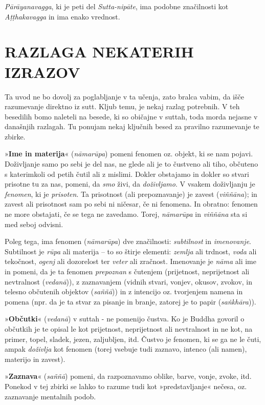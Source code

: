 \emph{Pārāyanavagga}, ki je peti del \emph{Sutta-nipāte}, ima podobne
značilnosti kot \emph{Aṭṭhakavagga} in ima enako vrednost.

\section{RAZLAGA NEKATERIH IZRAZOV}

Ta uvod ne bo dovolj za poglabljanje v ta učenja, zato bralca vabim, da
išče razumevanje direktno iz sutt. Kljub temu, je nekaj razlag
potrebnih. V teh besedilih bomo naleteli na besede, ki so običajne v
suttah, toda morda nejasne v današnjih razlagah. Tu ponujam nekaj
ključnih besed za pravilno razumevanje te zbirke.

»\textbf{Ime in materija}« (\emph{nāmarūpa}) pomeni fenomen oz. objekt,
ki se nam pojavi. Doživljanje samo po sebi je del nas, ne glede ali je
to čustveno ali tiho, občuteno s katerimkoli od petih čutil ali z
mislimi. Dokler obstajamo in dokler so stvari prisotne tu za nas,
pomeni, da \emph{smo} živi, da \emph{doživljamo}. V vsakem doživljanju
je \emph{fenomen}, ki je \emph{prisoten}. Ta prisotnost (ali
prepoznavanje) je zavest (\emph{viññāna}); in zavest ali prisotnost sam
po sebi ni ničesar, če ni fenomena. In obratno: fenomen ne more
obstajati, če se tega ne zavedamo. Torej, \emph{nāmarūpa} in
\emph{viññāna} sta si med seboj odvisni.

Poleg tega, ima fenomen (\emph{nāmarūpa}) dve značilnosti:
\emph{subtilnost} in \emph{imenovanje}. Subtilnost je \emph{rūpa} ali
materija -- to so štirje elementi: \emph{zemlja} ali trdnost,
\emph{voda} ali tekočnost, \emph{ogenj} ali dozorelost ter \emph{veter}
ali zračnost. Imenovanje je \emph{nāma} ali ime in pomeni, da je ta
fenomen \emph{prepoznan} s čutenjem (prijetnost, neprijetnost ali
nevtralnost (\emph{vedanā})), z zaznavanjem (vidnih stvari, vonjev,
okusov, zvokov, in telesno občutenih objektov (\emph{saññā})) in z
intencijo oz. tvorjenjem namena in pomena (npr. da je ta stvar za
pisanje in branje, zatorej je to papir (\emph{saṅkhāra})).

»\textbf{Občutki}« (\emph{vedanā}) v suttah - ne pomenijo čustva. Ko je
Buddha govoril o občutkih je te opisal le kot prijetnost, neprijetnost
ali nevtralnost in ne kot, na primer, topel, sladek, jezen, zaljubljen,
itd. Čustvo je fenomen, ki se ga ne le čuti, ampak \emph{doživlja} kot
fenomen (torej vsebuje tudi zaznavo, intenco (ali namen), materijo in
zavest).

»\textbf{Zaznava}« (\emph{saññā}) pomeni, da razpoznavamo oblike, barve,
vonje, zvoke, itd. Ponekod v tej zbirki se lahko to razume tudi kot
»predstavljanje« nečesa, oz. zaznavanje mentalnih podob.

